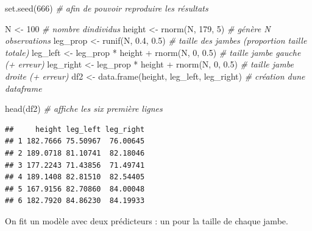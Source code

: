 \documentclass[
  a4paper,11pt,twoside,onecolumn,openright,final,oldfontcommands]{memoir}
\newenvironment{Shaded}{\begin{snugshade}}{\end{snugshade}}
\newcommand{\CommentTok}[1]{\textcolor[rgb]{0.56,0.35,0.01}{\textit{#1}}}
\newcommand{\DecValTok}[1]{\textcolor[rgb]{0.00,0.00,0.81}{#1}}
\newcommand{\FloatTok}[1]{\textcolor[rgb]{0.00,0.00,0.81}{#1}}
\newcommand{\FunctionTok}[1]{\textcolor[rgb]{0.00,0.00,0.00}{#1}}
\newcommand{\NormalTok}[1]{#1}
\newcommand{\OtherTok}[1]{\textcolor[rgb]{0.56,0.35,0.01}{#1}}
\newcommand{\SpecialCharTok}[1]{\textcolor[rgb]{0.00,0.00,0.00}{#1}}
\theoremstyle{definition}
\theoremstyle{definition}
\theoremstyle{definition}
\theoremstyle{remark}
\begin{document}
\begin{Shaded}
\begin{Highlighting}[]
\FunctionTok{set.seed}\NormalTok{(}\DecValTok{666}\NormalTok{) }\CommentTok{\# afin de pouvoir reproduire les résultats}

\NormalTok{N }\OtherTok{\textless{}{-}} \DecValTok{100} \CommentTok{\# nombre d\textquotesingle{}individus}
\NormalTok{height }\OtherTok{\textless{}{-}} \FunctionTok{rnorm}\NormalTok{(N, }\DecValTok{179}\NormalTok{, }\DecValTok{5}\NormalTok{) }\CommentTok{\# génère N observations}
\NormalTok{leg\_prop }\OtherTok{\textless{}{-}} \FunctionTok{runif}\NormalTok{(N, }\FloatTok{0.4}\NormalTok{, }\FloatTok{0.5}\NormalTok{) }\CommentTok{\# taille des jambes (proportion taille totale)}
\NormalTok{leg\_left }\OtherTok{\textless{}{-}}\NormalTok{ leg\_prop }\SpecialCharTok{*}\NormalTok{ height }\SpecialCharTok{+} \FunctionTok{rnorm}\NormalTok{(N, }\DecValTok{0}\NormalTok{, }\FloatTok{0.5}\NormalTok{) }\CommentTok{\# taille jambe gauche (+ erreur)}
\NormalTok{leg\_right }\OtherTok{\textless{}{-}}\NormalTok{ leg\_prop }\SpecialCharTok{*}\NormalTok{ height }\SpecialCharTok{+} \FunctionTok{rnorm}\NormalTok{(N, }\DecValTok{0}\NormalTok{, }\FloatTok{0.5}\NormalTok{) }\CommentTok{\# taille jambe droite (+ erreur)}
\NormalTok{df2 }\OtherTok{\textless{}{-}} \FunctionTok{data.frame}\NormalTok{(height, leg\_left, leg\_right) }\CommentTok{\# création d\textquotesingle{}une dataframe}

\FunctionTok{head}\NormalTok{(df2) }\CommentTok{\# affiche les six première lignes}
\end{Highlighting}
\end{Shaded}

\begin{verbatim}
##     height leg_left leg_right
## 1 182.7666 75.50967  76.00645
## 2 189.0718 81.10741  82.18046
## 3 177.2243 71.43856  71.49741
## 4 189.1408 82.81510  82.54405
## 5 167.9156 82.70860  84.00048
## 6 182.7920 84.86230  84.19933
\end{verbatim}

On fit un modèle avec deux prédicteurs : un pour la taille de chaque jambe.
\end{document}
